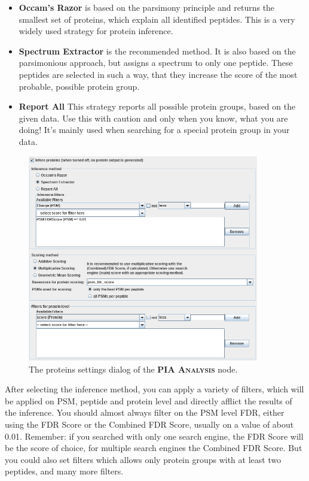 \documentclass[a4paper,11pt,twoside]{article}
\newcommand{\knimenode}[1]{{\scshape\bfseries #1}}
\begin{document}
\begin{itemize}
	\item \textbf{Occam's Razor} is based on the parsimony principle and
	returns the smallest set of proteins, which explain all identified
	peptides. This is a very widely used strategy for protein inference.

	\item \textbf{Spectrum Extractor} is the recommended method. It is also
	based on the parsimonious approach, but assigns a spectrum to only one
	peptide. These peptides are selected in such a way, that they increase the
	score of the most probable, possible protein group.

	\item \textbf{Report All} This strategy reports all possible protein groups,
	based on the given data. Use this with caution and only when you know, what
	you are doing! It's mainly used when searching for a special protein group in
	your data.
\end{itemize}

\begin{figure}[ht!]
	\centering
	\includegraphics[width=0.9\textwidth]{graphics/pia_settings_proteins}
	\caption{The proteins settings dialog of the \knimenode{PIA Analysis} node.}
	\label{pia_settings_proteins}
\end{figure}

After selecting the inference method, you can apply a variety of filters, which
will be applied on PSM, peptide and protein level and directly afflict the
results of the inference. You should almost always filter on the PSM level FDR,
either using the FDR Score or the Combined FDR Score, usually on a value of about
0.01. Remember: if you searched with only one search engine, the FDR Score will
be the score of choice, for multiple search engines the Combined FDR Score. But
you could also set filters which allows only protein groups with at least two
peptides, and many more filters.
\end{document}
